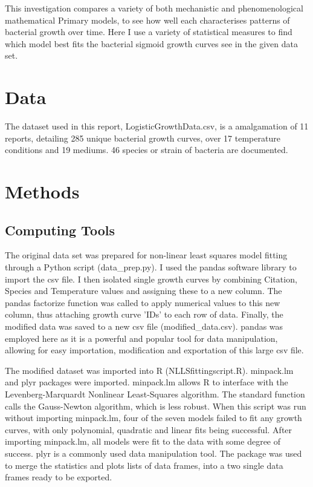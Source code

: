 \documentclass[titlepage]{article}
\begin{document}
\indent  This investigation compares a variety of both mechanistic and phenomenological mathematical Primary models, to see how well each characterises patterns of bacterial growth over time. Here I use a variety of statistical measures to find which model best fits the bacterial sigmoid growth curves see in the given data set.

\section{Data}
The dataset used in this report, LogisticGrowthData.csv, is a amalgamation of 11 reports, detailing 285 unique bacterial growth curves, over 17 temperature conditions and 19 mediums. 46 species or strain of bacteria are documented.

\section{Methods}

\subsection{Computing Tools}
The original data set was prepared for non-linear least squares model fitting through a Python script (data\_prep.py). I used the pandas software library to import the csv file. I then isolated single growth curves by combining Citation, Species and Temperature values and assigning these to a new column. The pandas factorize function was called to apply numerical values to this new column, thus attaching growth curve 'IDs' to each row of data. Finally, the modified data was saved to a new csv file (modified\_data.csv). pandas was employed here as it is a powerful and popular tool for data manipulation, allowing for easy importation, modification and exportation of this large csv file.

The modified dataset was imported into R (NLLSfittingscript.R). minpack.lm and plyr packages were imported. minpack.lm allows R to interface with the Levenberg-Marquardt Nonlinear Least-Squares algorithm. The standard function calls the Gauss-Newton algorithm, which is less robust. When this script was run without importing minpack.lm, four of the seven models failed to fit any growth curves, with only polynomial, quadratic and linear fits being successful. After importing minpack.lm, all models were fit to the data with some degree of success. plyr is a commonly used data manipulation tool. The package was used to merge the statistics and plots lists of data frames, into a two single data frames ready to be exported. 
\end{document}
